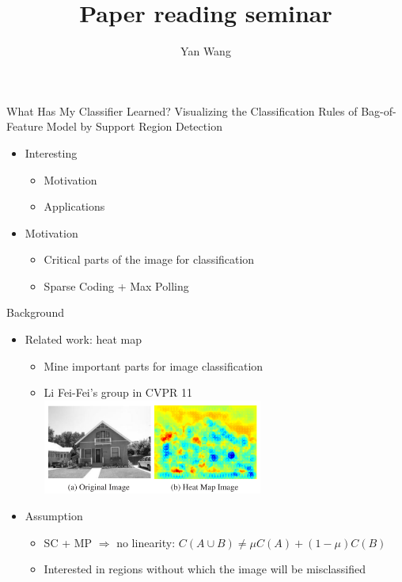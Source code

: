 \documentclass[12pt]{beamer}
\author{Yan Wang}
\title{Paper reading seminar}
\subtitle{}
\begin{document}
\begin{frame}[plain]
	\titlepage
\end{frame}

\begin{frame}{What Has My Classifier Learned? Visualizing the Classification Rules of Bag-of-Feature Model by Support Region Detection}
    \begin{itemize}
        \item Interesting
        \begin{itemize}
            \item Motivation
            \item Applications
        \end{itemize}
        \item Motivation
        \begin{itemize}
            \item Critical parts of the image for classification
            \item Sparse Coding + Max Polling
        \end{itemize}
    \end{itemize}
\end{frame}

\begin{frame}{Background}
    \begin{itemize}
        \item Related work: heat map
        \begin{itemize}
            \item Mine important parts for image classification
            \item Li Fei-Fei's group in CVPR 11
            \includegraphics[width=0.6\textwidth]{fig1.png}
        \end{itemize}
        \item Assumption
        \begin{itemize}
            \item SC + MP $\Rightarrow$ no linearity: $C(A \cup B) \neq \mu C(A) + (1 - \mu) C(B)$
            \item Interested in regions without which the image will be misclassified
        \end{itemize}
    \end{itemize}
\end{frame}
\end{document}
